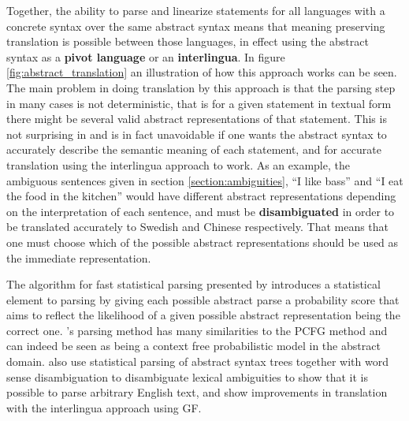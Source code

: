 Together, the ability to parse and linearize statements for all languages with a concrete syntax over the same abstract syntax means that meaning preserving translation is possible between those languages, in effect using the abstract syntax as a \textbf{pivot language} or an \textbf{interlingua}. In figure \ref{fig:abstract_translation}  an illustration of how this approach works can be seen. The main problem in doing translation by this approach is that the parsing step in many cases is not deterministic, that is for a given statement in textual form there might be several valid abstract representations of that statement. This is not surprising in and is in fact unavoidable if one wants the abstract syntax to accurately describe the semantic meaning of each statement, and for accurate translation using the interlingua approach to work. As an example, the ambiguous sentences given in section \ref{section:ambiguities}, ``I like bass'' and ``I eat the food in the kitchen'' would have different abstract representations depending on the interpretation of each sentence, and must be \textbf{disambiguated} in order to be translated accurately to Swedish and Chinese respectively. That means that one must choose which of the possible abstract representations should be used as the immediate representation. 

The algorithm for fast statistical parsing presented by \citet{angelov2014fast} introduces a statistical element to parsing by giving each possible abstract parse a probability score that aims to reflect the likelihood of a given possible abstract representation being the correct one. \citeauthor{angelov2014fast}'s parsing method has many similarities to the PCFG method and can indeed be seen as being a context free probabilistic model in the abstract domain. \citet{virk2014developing} also use statistical parsing of abstract syntax trees together with word sense disambiguation to disambiguate lexical ambiguities to show that it is possible to parse arbitrary English text, and show improvements in translation with the interlingua approach using GF.

